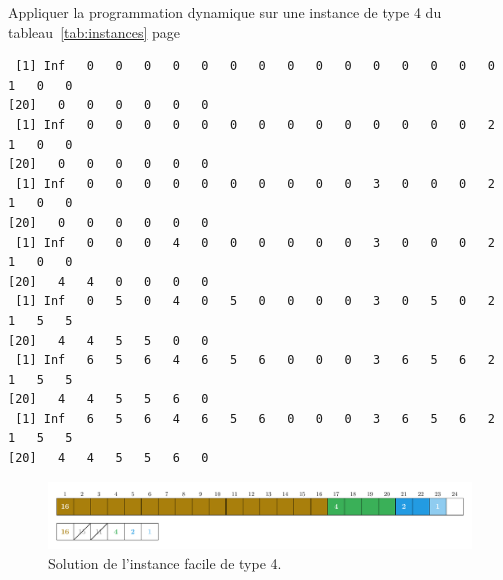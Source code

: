 \documentclass[11pt]{article}
\newcommand{\instance}[1]{instance de type #1 du tableau~\ref{tab:instances} page~\pageref{tab:instances}}
\begin{document}
  \begin{exercice}{}
    Appliquer la programmation dynamique sur une \instance{4}
  \end{exercice}

\begin{verbatim}
 [1] Inf   0   0   0   0   0   0   0   0   0   0   0   0   0   0   0   1   0   0
[20]   0   0   0   0   0   0
 [1] Inf   0   0   0   0   0   0   0   0   0   0   0   0   0   0   2   1   0   0
[20]   0   0   0   0   0   0
 [1] Inf   0   0   0   0   0   0   0   0   0   0   3   0   0   0   2   1   0   0
[20]   0   0   0   0   0   0
 [1] Inf   0   0   0   4   0   0   0   0   0   0   3   0   0   0   2   1   0   0
[20]   4   4   0   0   0   0
 [1] Inf   0   5   0   4   0   5   0   0   0   0   3   0   5   0   2   1   5   5
[20]   4   4   5   5   0   0
 [1] Inf   6   5   6   4   6   5   6   0   0   0   3   6   5   6   2   1   5   5
[20]   4   4   5   5   6   0
 [1] Inf   6   5   6   4   6   5   6   0   0   0   3   6   5   6   2   1   5   5
[20]   4   4   5   5   6   0
\end{verbatim}
    \begin{figure}[htbp]
    \centering
    \includegraphics[width=0.6\linewidth]{ex4-6-DP.pdf}
    \caption{Solution de l'instance facile de type 4.}
  \end{figure}
\end{document}
